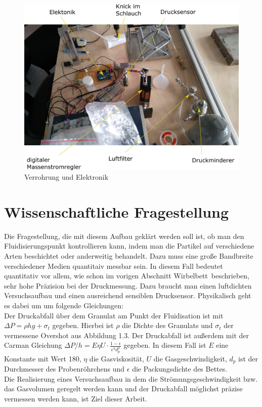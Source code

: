 \begin{figure}[h]
	\begin{center}
		\includegraphics[scale=0.6]{Kabel_Rohrleitungen_alt.png}
		\caption[Alter Aufbau 2]{Verrohrung und Elektronik}
	\end{center}
\end{figure}


\section{Wissenschaftliche Fragestellung}

Die Fragestellung, die mit diesem Aufbau geklärt werden soll ist, ob man den Fluidisierungspunkt kontrollieren kann, indem man die Partikel auf verschiedene Arten beschichtet oder anderweitig behandelt. Dazu muss eine große Bandbreite verschiedener Medien quantitaiv messbar sein. In diesem Fall bedeutet quantitativ vor allem, wie schon im vorigen Abschnitt \glqq Wirbelbett\grqq \ beschrieben, sehr hohe Präzision bei der Druckmessung. Dazu braucht man einen luftdichten Versuchsaufbau und einen ausreichend sensiblen Drucksensor. Physikalisch geht es dabei um um folgende Gleichungen: \\
Der Druckabfall über dem Granulat am Punkt der Fluidisation ist mit $\Delta P = \rho h g + \sigma_t$ gegeben. Hierbei ist $\rho$ die Dichte des Granulats und $\sigma_t$ der vermessene Overshot aus Abbildung 1.3. Der Druckabfall ist außerdem mit der Carman Gleichung $\Delta P / h = E \eta U \cdot \frac{1 - \epsilon}{\epsilon^3 d_p^2}$ gegeben. In diesem Fall ist $E$ eine Konstante mit Wert 180, $\eta$ die Gasviskosität, $U$ die Gasgeschwindigkeit, $d_p$ ist der Durchmesser des Probenröhrchens und $\epsilon$ die Packungsdichte des Bettes. \\
Die Realisierung eines Versuchsaufbau in dem die Strömungsgeschwindigkeit bzw. das Gasvolumen geregelt werden kann und der Druckabfall möglichst präzise vermessen werden kann, ist Ziel dieser Arbeit.


